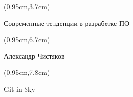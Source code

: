\documentclass[xetex,18pt,aspectratio=43]{beamer}
\title[Современные тенденции в разработке ПО]{}
\author[Александр Чистяков, Git in Sky]{}
\date{}
\newcommand\Bigfont{\fontsize{22}{22}\selectfont}
\newcommand\Authorfont{\fontsize{17}{17}\selectfont}
\newcommand\Orgfont{\fontsize{13}{13}\selectfont}
\begin{document}
{ %
    \begin{frame}[plain]
      \begin{textblock*}{\framewidth}(0.95cm,3.7cm) %
        \Bigfont
          \begin{center}
          Современные тенденции в разработке ПО
          \end{center}
      \end{textblock*}
      \begin{textblock*}{\framewidth}(0.95cm,6.7cm) %
        \Authorfont
          \begin{center}
          Александр Чистяков
          \end{center}
      \end{textblock*}
      \begin{textblock*}{\framewidth}(0.95cm,7.8cm) %
        \Orgfont
          \begin{center}
          Git in Sky
          \end{center}
      \end{textblock*}
     \end{frame}
}
\end{document}
